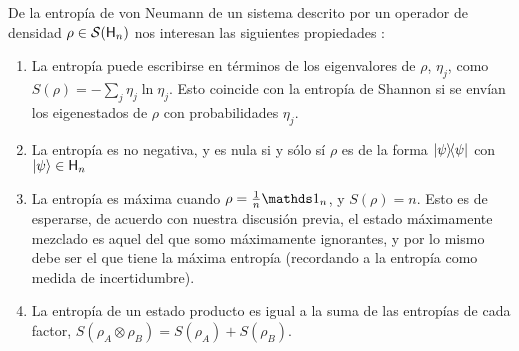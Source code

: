 De la entropía de von Neumann de un sistema descrito por un operador de densidad $\rho\in\mathcal{S}({\sf H}_{n})$ nos interesan las siguientes propiedades \cite{Chuang}:
\begin{enumerate}
    \item La entropía puede escribirse en términos de los eigenvalores de $\rho$, $\eta_{j}$, como $S(\rho)=-\sum_{j}\eta_{j}\ln{\eta_{j}}$. Esto coincide con la entropía de Shannon si se envían los eigenestados de $\rho$ con probabilidades $\eta_{j}$.
    \item La entropía es no negativa, y es nula si y sólo sí $\rho$ es de la forma $\dyad{\psi}$ con $\ket{\psi}\in{\sf H}_{n}$
    \item La entropía es máxima cuando $\rho=\frac{1}{n}\Id_{n}$, y $S(\rho)=n$. Esto es de esperarse, de acuerdo con nuestra discusión previa, el estado máximamente mezclado es aquel del que somo máximamente ignorantes, y por lo mismo debe ser el que tiene la máxima entropía (recordando a la entropía como medida de incertidumbre).
    \item La entropía de un estado producto es igual a la suma de las entropías de cada factor, $S(\rho_{A}\otimes\rho_{B})=S(\rho_{A})+S(\rho_{B})$.
\end{enumerate}